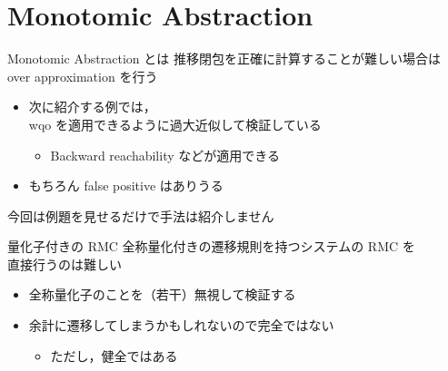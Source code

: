 \documentclass[presentation, xetex]{beamer}
\begin{document}
\section{Monotomic Abstraction}
\label{sec:orgbf9d18d}

\begin{frame}[label={sec:orga879f40}]{Monotomic Abstraction とは}
推移閉包を正確に計算することが難しい場合は \\
\alert{\alert{over approximation}} を行う
\begin{itemize}
\item 次に紹介する例では，\\
wqo を適用できるように過大近似して検証している
\begin{itemize}
\item Backward reachability などが適用できる
\end{itemize}
\item もちろん false positive はありうる
\end{itemize}


今回は例題を見せるだけで手法は紹介しません
\end{frame}


\begin{frame}[label={sec:org5aff0f2}]{量化子付きの RMC}
全称量化付きの遷移規則を持つシステムの RMC を \\
直接行うのは難しい
\begin{itemize}
\item 全称量化子のことを（若干）無視して検証する
\item 余計に遷移してしまうかもしれないので完全ではない
\begin{itemize}
\item ただし，健全ではある
\end{itemize}
\end{itemize}
\end{frame}
\end{document}

